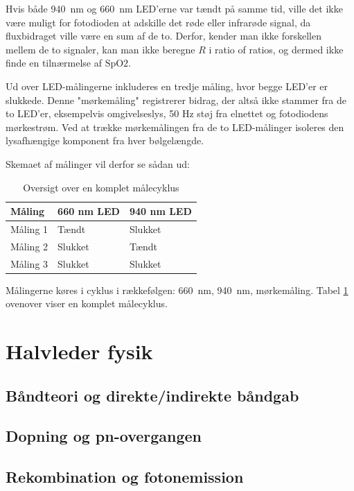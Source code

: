 Hvis både \SI{940}{nm} og \SI{660}{nm} LED'erne var tændt på samme tid, ville det ikke være muligt for fotodioden at adskille det røde eller infrarøde signal, da fluxbidraget ville være en sum af de to. Derfor, kender man ikke forskellen mellem de to signaler, kan man ikke beregne $R$ i ratio of ratios, og dermed ikke finde en tilnærmelse af $\text{SpO2}$.

Ud over LED-målingerne inkluderes en tredje måling, hvor begge LED'er er slukkede. Denne "mørkemåling" registrerer bidrag, der altså ikke stammer fra de to LED'er, eksempelvis omgivelseslys, 50 Hz støj fra elnettet og fotodiodens mørkestrøm. Ved at trække mørkemålingen fra de to LED-målinger isoleres den lysafhængige komponent fra hver bølgelængde.

Skemaet af målinger vil derfor se sådan ud:

\begin{table}[h]
\centering
\caption{Oversigt over en komplet målecyklus}
\label{tab:maalinger}
\begin{tabular}{lll}
\toprule
Måling & 660 nm LED & 940 nm LED \\
\midrule
Måling 1 & Tændt & Slukket \\
Måling 2 & Slukket & Tændt \\
Måling 3 & Slukket & Slukket \\
\bottomrule
\end{tabular}
\end{table}

Målingerne køres i cyklus i rækkefølgen: \SI{660}{nm}, \SI{940}{nm}, mørkemåling. Tabel \ref{tab:maalinger} ovenover viser en komplet målecyklus.

\section{Halvleder fysik}

\subsection{Båndteori og direkte/indirekte båndgab}

\subsection{Dopning og pn-overgangen}

\subsection{Rekombination og fotonemission}

